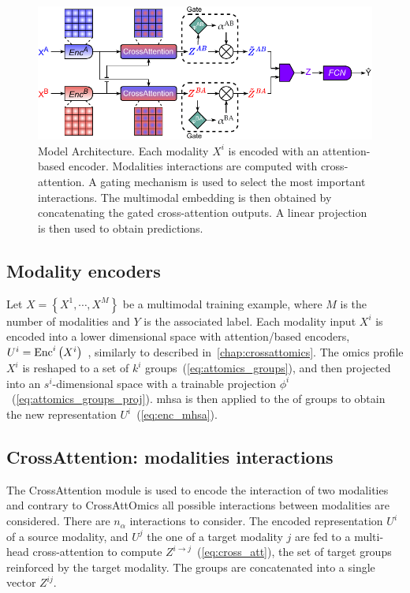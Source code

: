 \documentclass[../main.tex]{subfiles}
\begin{document}
	\begin{figure}[htbp]
		\centering
		\includegraphics[width=\textwidth]{CrossAttOmicsGate.pdf}
		\caption[CrossAttOmicsGate architecture]{Model Architecture. Each modality \(X^i\) is encoded with an attention-based encoder. Modalities interactions are computed with cross-attention. A gating mechanism is used to select the most important interactions. The multimodal embedding is then obtained by concatenating the gated cross-attention outputs. A linear projection is then used to obtain predictions.}
		\label{fig:arch}
	\end{figure}

	\subsection{Modality encoders}
		Let \( X = \left\{X^{1}, \cdots, X^{M} \right\} \) be a multimodal training example, where \(M\) is the number of modalities and \(Y\) is the associated label.
		Each modality input \(X^{i}\) is encoded into a lower dimensional space with attention\-/based encoders,\(U^{i} = \operatorname{Enc}^{i}\left(X^{i}\right)\)~\cite{AttOmics}, similarly to  described in~\cref{chap:crossattomics}.
		The omics profile \(X^{i}\) is reshaped to a set of \(k^i\) groups~(\cref{eq:attomics_groups}), and then projected into an \(s^i\)-dimensional space with a trainable projection \(\phi^i\)~(\cref{eq:attomics_groups_proj}).
		\Gls{mhsa} is then applied to the of groups to obtain the new representation \(U^{i}\)~(\cref{eq:enc_mhsa}).

	\subsection{CrossAttention: modalities interactions}
		The CrossAttention module is used to encode the interaction of two modalities and contrary to CrossAttOmics all possible interactions between modalities are considered.
		There are \(n_{\alpha}\) interactions to consider.
		The encoded representation \(U^{i}\) of a source modality, and \(U^{j}\) the one of a target modality \(j\) are fed to a multi-head cross-attention to compute \(Z^{i\rightarrow j}\)~(\cref{eq:cross_att}), the set of target groups reinforced by the target modality.
		The groups are concatenated into a single vector \(Z^{ij}\).
\end{document}
